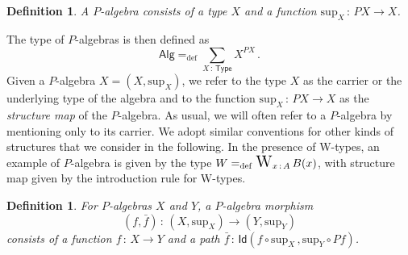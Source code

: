 \documentclass[10pt,a4paper,oneside,reqno]{amsart}
\theoremstyle{mythm}
\theoremstyle{mydef}
\newtheorem{definition}[theorem]{Definition}
\theoremstyle{myrmk}
\newcommand{\defeq}{=_{\mathrm{def}}}
\newcommand{\co}{\,{:}\,}
\newcommand{\Id}{\mathsf{Id}}
\DeclareMathOperator*{\WW}{\text{\Large $\mathrm{W}$}}
\newcommand{\U}{\mathsf{Type}}
\newcommand{\Palg}{\mathsf{Alg}}
\renewcommand{\sup}{\mathrm{sup}}
\begin{document}
\begin{definition} A \emph{$P$-algebra} consists of a type $X$ and a function $\sup_X \co PX \to X$. 
\end{definition}

\smallskip

 The type of $P$-algebras is then defined as 
 \[
 \Palg  \defeq \sum_{X \co \U} X^{PX} \, .
 \]
 Given a $P$-algebra $X = (X, \sup_X)$,
 we refer to the type $X$ as the carrier or the underlying type of the algebra and to the function $\sup_X \co PX\to X$ as the \emph{structure map} of the $P$-algebra. 
 As usual,  we will often refer to a 
 $P$-algebra by mentioning only to its carrier. We adopt similar conventions for other kinds of structures that we consider
 in the following.  In the
 presence of W-types, an example of $P$-algebra is given by the type $W \defeq \WW_{x\co A} B(x)$, with structure map given by the introduction rule for W-types.
 


\begin{definition}
For $P$-algebras $X$ and $Y$, a \emph{$P$-algebra morphism}
\[
(f, \bar{f}) \co (X, \sup_X) \rightarrow (Y, \sup_Y)
\]
consists of a function $f \co X \rightarrow Y$ and a path $\bar{f} \co \Id( f \circ \sup_X \, ,  \sup_{Y} \circ P f )$.
\end{definition}
\end{document}
